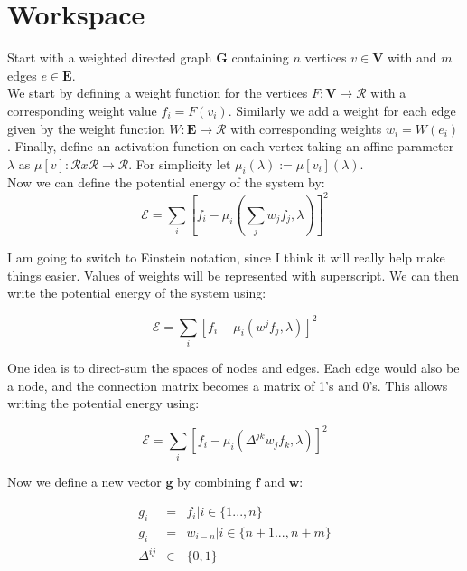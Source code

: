 \documentclass{article}
\begin{document}
\section*{Workspace}

Start with a weighted directed graph $\mathbf{G}$ containing $n$ vertices $v \in \mathbf{V}$ with and $m$ edges $e \in \mathbf{E}$. \\

We start by defining a weight function for the vertices $F: \mathbf{V} \rightarrow \mathcal{R}$ with a corresponding weight value $f_i = F(v_i)$. 
Similarly we add a weight for each edge given by the weight function $W: \mathbf{E} \rightarrow \mathcal{R}$ with corresponding weights $w_i = W(e_i)$. 
Finally, define an activation function on each vertex taking an affine parameter $\lambda$ as $\mu\left[v\right]: \mathcal{R} x \mathcal{R} \rightarrow \mathcal{R}$. 
For simplicity let $\mu_i(\lambda) := \mu[v_i](\lambda)$.\\

Now we can define the potential energy of the system by:
\begin{equation}
\mathcal{E} = \sum_{i}\left[f_i - \mu_i(\sum_jw_jf_j, \lambda)\right]^2
\end{equation}

I am going to switch to Einstein notation, since I think it will really help make things easier. Values of weights will be represented with superscript.
We can then write the potential energy of the system using:

\begin{equation}
    \mathcal{E} = \sum_{i}\left[f_i - \mu_i(w^jf_j, \lambda)\right]^2
\end{equation}

One idea is to direct-sum the spaces of nodes and edges.
Each edge would also be a node, and the connection matrix becomes a matrix of 1's and 0's.
This allows writing the potential energy using:

\begin{equation}
    \mathcal{E} = \sum_{i}\left[f_i - \mu_i(\Delta^{jk}w_jf_k, \lambda)\right]^2
\end{equation}

Now we define a new vector $\mathbf{g}$ by combining $\mathbf{f}$ and $\mathbf{w}$:

\begin{eqnarray}
    g_i &=& f_i | i \in \{1...,n\} \\
    g_i &=& w_{i-n} | i \in \{n+1...,n+m\} \\
    \Delta^{ij} &\in & \{0, 1\}
\end{eqnarray}
\end{document}
